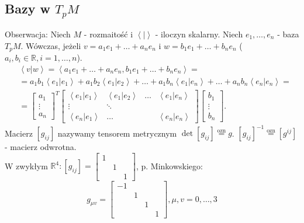 \documentclass[../main.tex]{subfiles}
\begin{document}
\subsection{Bazy w $T_pM$ }
Obserwacja: Niech $M$ - rozmaitość i $\left< | \right>$ - iloczyn skalarny. Niech $e_1,\ldots,e_n$ - baza $T_pM$. Wówczas, jeżeli $v = a_1e_1+\ldots+a_ne_n$ i $w = b_1e_1+\ldots+b_ne_n$ ($a_i,b_i\in \mathbb{R}, i= 1,\ldots,n$).
\begin{align*}
    &\left<v|w \right> = \left<a_1e_1+\ldots+a_ne_n, b_1e_1+\ldots+b_ne_n \right> = \\
    &= a_1b_1\left<e_1|e_1 \right> + a_1b_2\left<e_1|e_2 \right>+ \ldots + a_1b_n \left<e_1|e_n \right> + \ldots + a_nb_n\left<e_n|e_n \right> = \\
    & = \begin{bmatrix} a_1\\ \vdots \\ a_n\end{bmatrix}^T \begin{bmatrix} \left<e_1|e_1 \right> & \left<e_1|e_2 \right>&\ldots&\left<e_1|e_n \right>\\ \vdots & \ddots & \\ \left<e_n|e_1 \right> & \ldots & & \left<e_n|e_n \right> \end{bmatrix} \begin{bmatrix} b_1 \\ \vdots \\ b_n \end{bmatrix}
.\end{align*}
Macierz $\left[ g_{ij} \right] $ nazywamy tensorem metrycznym $\det \left[ g_{ij} \right] \overset{\text{ozn}}{=} g$. $\left[ g_{ij} \right] ^{-1} \overset{\text{ozn}}{=} \left[ g^{ij} \right] $ - macierz odwrotna.\\
W zwykłym $\mathbb{R}^4: \left[ g_{ij} \right] = \begin{bmatrix} 1&&\\ &1&\\ &&1 \end{bmatrix} $, p. Minkowskiego:
    \[
        g_{\mu v} = \begin{bmatrix} -1&&&\\ &1&& \\ &&1& \\ &&&1 \end{bmatrix}, \mu,v = 0,\ldots,3
    \]
\end{document}
